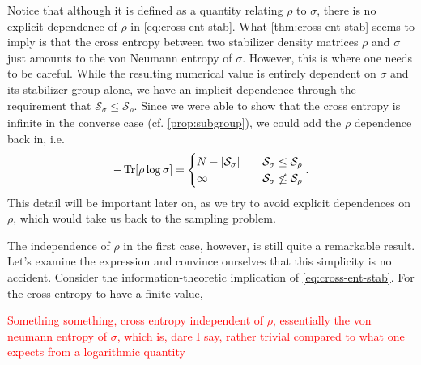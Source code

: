 Notice that although it is defined as a quantity relating $\rho$ to $\sigma$,
there is no explicit dependence of $\rho$ in \cref{eq:cross-ent-stab}.
What \cref{thm:cross-ent-stab} seems to imply is that the cross entropy between two stabilizer
density matrices $\rho$ and $\sigma$ just amounts to the von Neumann entropy of
$\sigma$. However, this is where one needs to be careful. While the resulting
numerical value is entirely dependent on $\sigma$ and its stabilizer group
alone, we have an implicit dependence through the requirement that
$\mathcal{S}_\sigma \leq \mathcal{S}_\rho$. Since we were able to show that the
cross entropy is infinite in the converse case (cf. \cref{prop:subgroup}), we
could add the $\rho$ dependence back in, i.e.
\begin{align}
  -\Tr[\rho\log\sigma] = \begin{cases}
    N - \abs{\mathcal{S}_\sigma} &\quad{\mathcal{S}_\sigma \leq
    \mathcal{S}_\rho}\\
      \infty &\quad{\mathcal{S}_\sigma \not\leq \mathcal{S}_\rho}
  \end{cases}
.\end{align}
This detail will be important later on, as we try to avoid explicit
dependences on $\rho$, which would take us back to the sampling problem.

The independence of $\rho$ in the first case, however, is still quite a
remarkable result. Let's examine the expression and convince ourselves that
this simplicity is no accident. Consider the information-theoretic implication
of \cref{eq:cross-ent-stab}. For the cross entropy to have a finite value, 

\textcolor{red}{Something something, cross entropy independent of $\rho$,
  essentially the von neumann entropy of $\sigma$, which is, dare I say,
rather trivial compared to what one expects from a logarithmic quantity}

